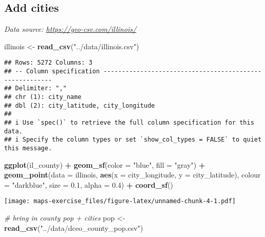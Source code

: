 \documentclass[
]{article}
\newenvironment{Shaded}{\begin{snugshade}}{\end{snugshade}}
\newcommand{\AttributeTok}[1]{\textcolor[rgb]{0.13,0.29,0.53}{#1}}
\newcommand{\CommentTok}[1]{\textcolor[rgb]{0.56,0.35,0.01}{\textit{#1}}}
\newcommand{\FloatTok}[1]{\textcolor[rgb]{0.00,0.00,0.81}{#1}}
\newcommand{\FunctionTok}[1]{\textcolor[rgb]{0.13,0.29,0.53}{\textbf{#1}}}
\newcommand{\NormalTok}[1]{#1}
\newcommand{\OtherTok}[1]{\textcolor[rgb]{0.56,0.35,0.01}{#1}}
\newcommand{\SpecialCharTok}[1]{\textcolor[rgb]{0.81,0.36,0.00}{\textbf{#1}}}
\newcommand{\StringTok}[1]{\textcolor[rgb]{0.31,0.60,0.02}{#1}}
\begin{document}
\hypertarget{add-cities}{%
\subsection{Add cities}\label{add-cities}}

\emph{Data source: \url{https://geo-csv.com/illinois/}}

\begin{Shaded}
\begin{Highlighting}[]
\NormalTok{illinois }\OtherTok{\textless{}{-}} \FunctionTok{read\_csv}\NormalTok{(}\StringTok{"../data/illinois.csv"}\NormalTok{)}
\end{Highlighting}
\end{Shaded}

\begin{verbatim}
## Rows: 5272 Columns: 3
## -- Column specification --------------------------------------------------------
## Delimiter: ","
## chr (1): city_name
## dbl (2): city_latitude, city_longitude
## 
## i Use `spec()` to retrieve the full column specification for this data.
## i Specify the column types or set `show_col_types = FALSE` to quiet this message.
\end{verbatim}

\begin{Shaded}
\begin{Highlighting}[]
\FunctionTok{ggplot}\NormalTok{(il\_county) }\SpecialCharTok{+} 
  \FunctionTok{geom\_sf}\NormalTok{(}\AttributeTok{color =} \StringTok{"blue"}\NormalTok{, }\AttributeTok{fill =} \StringTok{"gray"}\NormalTok{) }\SpecialCharTok{+}
 \FunctionTok{geom\_point}\NormalTok{(}\AttributeTok{data =}\NormalTok{ illinois, }
            \FunctionTok{aes}\NormalTok{(}\AttributeTok{x =}\NormalTok{ city\_longitude, }\AttributeTok{y =}\NormalTok{ city\_latitude), }
            \AttributeTok{colour =} \StringTok{"darkblue"}\NormalTok{, }\AttributeTok{size =} \FloatTok{0.1}\NormalTok{, }\AttributeTok{alpha =} \FloatTok{0.4}\NormalTok{) }\SpecialCharTok{+} 
  \FunctionTok{coord\_sf}\NormalTok{() }
\end{Highlighting}
\end{Shaded}

\texttt{[image: maps-exercise\_files/figure-latex/unnamed-chunk-4-1.pdf]}

\begin{Shaded}
\begin{Highlighting}[]
\CommentTok{\# bring in county pop + cities}
\NormalTok{pop }\OtherTok{\textless{}{-}} \FunctionTok{read\_csv}\NormalTok{(}\StringTok{"../data/dceo\_county\_pop.csv"}\NormalTok{)}
\end{Highlighting}
\end{Shaded}
\end{document}
